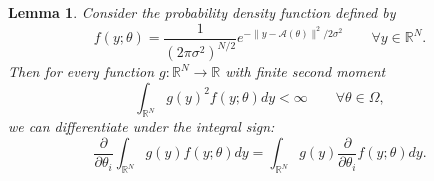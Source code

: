 \documentclass[times,10pt]{elsarticle}
\theoremstyle{plain}
\newtheorem{lemma}[theorem]{Lemma}
\begin{document}
\begin{lemma}
\label{lemma.differentiation under the integral sign}
Consider the probability density function defined by
\begin{equation*}
f(y;\theta)
=\frac{1}{(2\pi \sigma^2)^{N/2}}e^{-\|y-\mathcal{A}(\theta)\|^2/2\sigma^2}
\qquad
\forall y\in\mathbb{R}^N.
\end{equation*}
Then for every function $g\colon\mathbb{R}^N\rightarrow\mathbb{R}$ with finite second moment
\begin{equation*}
\int_{\mathbb{R}^N}g(y)^2f(y;\theta)dy
<\infty
\qquad
\forall \theta\in\Omega,
\end{equation*}
we can differentiate under the integral sign:
\begin{equation*}
\frac{\partial}{\partial\theta_i}\int_{\mathbb{R}^N}g(y)f(y;\theta)dy
=\int_{\mathbb{R}^N}g(y)\frac{\partial}{\partial\theta_i}f(y;\theta)dy.
\end{equation*}
\end{lemma}
\end{document}

